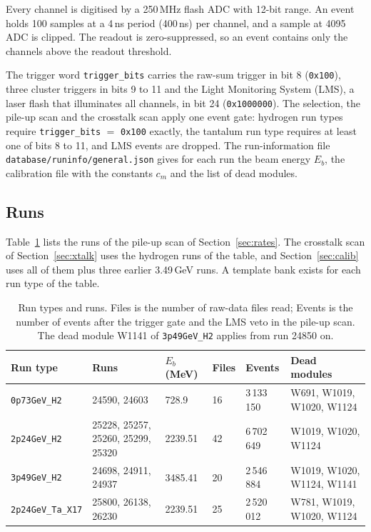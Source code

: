 \documentclass[11pt]{article}
\newcommand{\code}[1]{\texttt{#1}}
\begin{document}
Every channel is digitised by a 250\,MHz flash ADC with 12-bit range. An event holds 100 samples at a 4\,ns period (400\,ns) per channel, and a sample at 4095\,ADC is clipped. The readout is zero-suppressed, so an event contains only the channels above the readout threshold.

The trigger word \code{trigger\_bits} carries the raw-sum trigger in bit 8 (\code{0x100}), three cluster triggers in bits 9 to 11 and the Light Monitoring System (LMS), a laser flash that illuminates all channels, in bit 24 (\code{0x1000000}). The selection, the pile-up scan and the crosstalk scan apply one event gate: hydrogen run types require \code{trigger\_bits} $=$ \code{0x100} exactly, the tantalum run type requires at least one of bits 8 to 11, and LMS events are dropped. The run-information file \code{database/runinfo/general.json} gives for each run the beam energy $E_b$, the calibration file with the constants $c_m$ and the list of dead modules.

\subsection{Runs}
\label{sec:runs}

Table~\ref{tab:runs} lists the runs of the pile-up scan of Section~\ref{sec:rates}. The crosstalk scan of Section~\ref{sec:xtalk} uses the hydrogen runs of the table, and Section~\ref{sec:calib} uses all of them plus three earlier 3.49\,GeV runs. A template bank exists for each run type of the table.

\begin{table}[htbp]
\centering
\caption{Run types and runs. Files is the number of raw-data files read; Events is the number of events after the trigger gate and the LMS veto in the pile-up scan. The dead module W1141 of \code{3p49GeV\_H2} applies from run 24850 on.}
\label{tab:runs}
\small
\begin{tabular}{lp{}llll}
\toprule
Run type & Runs & $E_b$ (MeV) & Files & Events & Dead modules \\
\midrule
\code{0p73GeV\_H2} & 24590, 24603 & 728.9 & 16 & 3\,133\,150 & W691, W1019, W1020, W1124 \\
\code{2p24GeV\_H2} & 25228, 25257, 25260, 25299, 25320 & 2239.51 & 42 & 6\,702\,649 & W1019, W1020, W1124 \\
\code{3p49GeV\_H2} & 24698, 24911, 24937 & 3485.41 & 20 & 2\,546\,884 & W1019, W1020, W1124, W1141 \\
\code{2p24GeV\_Ta\_X17} & 25800, 26138, 26230 & 2239.51 & 25 & 2\,520\,012 & W781, W1019, W1020, W1124 \\
\bottomrule
\end{tabular}
\end{table}
\end{document}
